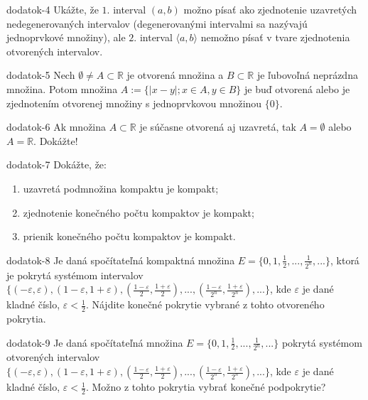 \begin{defproblem}{dodatok-4}
Ukážte, že $1.$ interval $(a,b)$ možno písať ako zjednotenie uzavretých nedegenerovaných intervalov (degenerovanými intervalmi sa nazývajú jednoprvkové množiny), ale $2.$ interval $\langle a,b \rangle$ nemožno písať v tvare zjednotenia otvorených intervalov.
\end{defproblem}

\begin{defproblem}{dodatok-5}
Nech $\emptyset \neq A \subset \mathbb{R}$ je otvorená množina a $B \subset \mathbb{R}$ je ľubovoľná neprázdna množina. Potom množina $A:=\{|x-y|; x \in A, y \in B\}$ je buď otvorená alebo je zjednotením otvorenej množiny s jednoprvkovou množinou $\{0 \}$.
\end{defproblem}

\begin{defproblem}{dodatok-6}
Ak množina $A \subset \mathbb{R}$ je súčasne otvorená aj uzavretá, tak $A=\emptyset$ alebo $A=\mathbb{R}$. Dokážte!
\end{defproblem}

\begin{defproblem}{dodatok-7}
Dokážte, že:
\begin{enumerate}
\item uzavretá podmnožina kompaktu je kompakt;
\item zjednotenie konečného počtu kompaktov je kompakt;
\item prienik konečného počtu kompaktov je kompakt.
\end{enumerate}
\end{defproblem}

\begin{defproblem}{dodatok-8}
Je daná spočítateľná kompaktná množina $E=\{0,1,\frac{1}{2},...,\frac{1}{2^n},...\}$, ktorá je pokrytá systémom intervalov $\{(-\varepsilon, \varepsilon),(1-\varepsilon,1+\varepsilon),(\frac{1-\varepsilon}{2},\frac{1+\varepsilon}{2}),...,(\frac{1-\varepsilon}{2^n},\frac{1+\varepsilon}{2^n}),...\}$, kde $\varepsilon$ je dané kladné číslo, $\varepsilon<\frac{1}{2}$. Nájdite konečné pokrytie vybrané z tohto otvoreného pokrytia.
\end{defproblem}

\begin{defproblem}{dodatok-9}
Je daná spočítateľná množina $E=\{0,1,\frac{1}{2},...,\frac{1}{2^n},... \}$ pokrytá systémom otvorených intervalov $\{(-\varepsilon, \varepsilon),(1-\varepsilon,1+\varepsilon),(\frac{1-\varepsilon}{2},\frac{1+\varepsilon}{2}),...,(\frac{1-\varepsilon}{2^n},\frac{1+\varepsilon}{2^n}),...\}$, kde $\varepsilon$ je dané kladné číslo, $\varepsilon<\frac{1}{2}$. Možno z tohto pokrytia vybrať konečné podpokrytie?
\end{defproblem}

